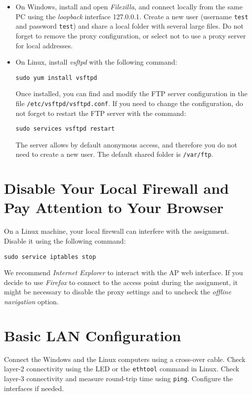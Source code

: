 \begin{itemize}

\item On Windows, install and open \emph{Filezilla}, and connect locally from the same PC using the \emph{loopback} interface 127.0.0.1. Create a new user (username \texttt{\color{blue}test} and password \texttt{\color{blue}test}) and share a local folder with several large files. Do not forget to remove the proxy configuration, or select not to use a proxy server for local addresses.

\item On Linux, install \emph{vsftpd} with the following command:
\begin{lstlisting}
sudo yum install vsftpd
\end{lstlisting}
    Once installed, you can find and modify the FTP server configuration in the file \texttt{/etc/vsftpd/vsftpd.conf}. If you need to change the configuration, do not forget to restart the FTP server with the command:
\begin{lstlisting}
sudo services vsftpd restart
\end{lstlisting}
    The server allows by default anonymous access, and therefore you do not need to create a new user. The default shared folder is \texttt{/var/ftp}.
\end{itemize}

\section{Disable Your Local Firewall and Pay Attention to Your Browser}

On a Linux machine, your local firewall can interfere with the assignment. Disable it using the following command:

\begin{lstlisting}
sudo service iptables stop
\end{lstlisting}

We recommend \emph{Internet Explorer} to interact with the AP web interface.
If you decide to use \emph{Firefox} to connect to the access point during the assignment, it might be necessary to disable the proxy settings and to uncheck the \emph{offline navigation} option.

\section{Basic LAN Configuration}

Connect the Windows and the Linux computers using a cross-over cable. Check layer-2 connectivity using the LED or the \texttt{\color{blue}ethtool} command in Linux. Check layer-3 connectivity and measure round-trip time using \texttt{\color{blue}ping}. Configure the interfaces if needed.

